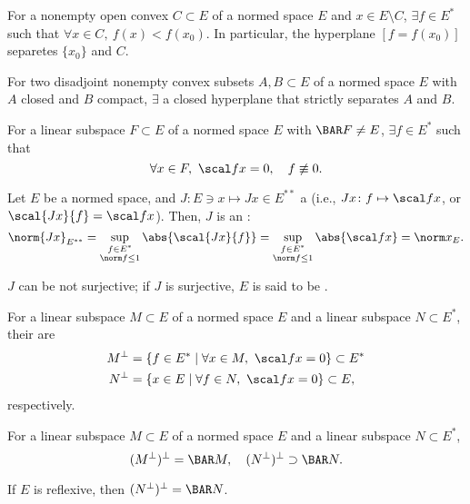 For a nonempty open convex $C \subset E$ of a normed space $E$ and $x \in E \setminus C$, $\exists f \in E^*$ such that $\forall x \in C,\ f(x) < f(x_0)$. In particular, the hyperplane $[f = f(x_0)]$ separetes $\{ x_0 \}$ and $C$.

For two disadjoint nonempty convex subsets $A, B \subset E$ of a normed space $E$ with $A$ closed and $B$ compact, $\exists$ a closed hyperplane that strictly separates $A$ and $B$.

For a linear subspace $F \subset E$ of a normed space $E$ with $\BAR F \neq E$, $\exists f \in E^*$ such that
\[
  \forall x \in F,\ \scal fx = 0,\quad f \not\equiv 0.
\]

Let $E$ be a normed space, and $J \colon E \ni x \mapsto Jx \in E^{**}$ a  (i.e., $Jx \colon f \mapsto \scal fx$, or $\scal{Jx}{f} = \scal fx$). Then, $J$ is an :
\[
  \norm{Jx}_{E^{**}} = \sup_{\substack{f \in E^* \\ \norm f \le 1}} \abs{\scal{Jx}{f}} = \sup_{\substack{f \in E^* \\ \norm f \le 1}} \abs{\scal fx} = \norm x_E.
\]

$J$ can be not surjective; if $J$ is surjective, $E$ is said to be .

For a linear subspace $M \subset E$ of a normed space $E$ and a linear subspace $N \subset E^*$, their  are
\begin{align*}
  M^\perp &= \{ f \in E^* \mid \forall x \in M,\ \scal fx = 0\} \subset E^* \\
  N^\perp &= \{ x \in E \mid \forall f \in N,\ \scal fx = 0\} \subset E,
\end{align*}
respectively.

For a linear subspace $M \subset E$ of a normed space $E$ and a linear subspace $N \subset E^*$,
\[
  (M^\perp)^\perp = \BAR M,\quad (N^\perp)^\perp \supset \BAR N.
\]

If $E$ is reflexive, then $(N^\perp)^\perp = \BAR N$.
